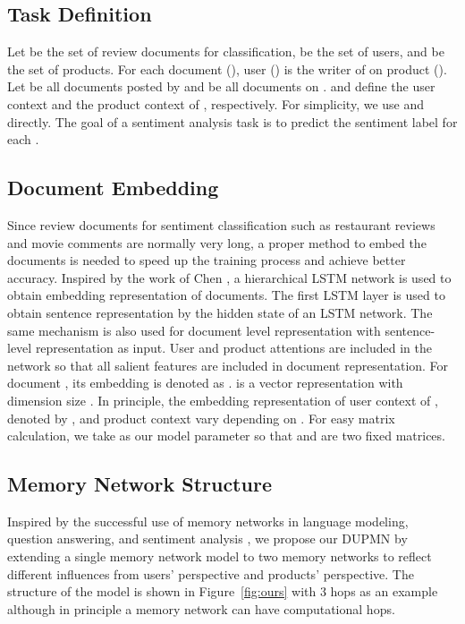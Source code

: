 \documentclass[11pt,a4paper]{article}
\begin{document}
\subsection{Task Definition}
Let  be the set of review documents for classification,  be the set of users, and  be the set of products. For each document (), user () is the writer of  on product (). Let  be all documents posted by  and  be all documents on .  and  define the user context and the product context of , respectively. For simplicity, we use  and  directly. The goal of a sentiment analysis task is to predict the sentiment label for each . 

\subsection{Document Embedding}
    Since review documents for sentiment classification such as restaurant reviews and movie comments are normally very long, a proper method to embed the documents is needed to speed up the training process and achieve better accuracy. Inspired by the work of Chen \cite{chen2016neural}, a hierarchical LSTM network is used to obtain embedding representation of documents. The first LSTM layer is used to obtain sentence representation by the hidden state of an LSTM network. The same mechanism is also used for document level representation with sentence-level representation as input. User and product attentions are included in the network so that all salient features are included in document representation. For document , its embedding is denoted as .  is a vector representation with dimension size . In principle, the embedding representation of user context of , denoted by ,  and product context  vary depending on . For easy matrix calculation, we take  as our model parameter so that  and  are two fixed  matrices.

\subsection{Memory Network Structure}
Inspired by the successful use of memory networks in language modeling, question answering,  and sentiment analysis \cite{sukhbaatar2015end, tang2016aspect,dou2017capturing}, we propose our DUPMN by extending a single memory network model to two memory networks to reflect different influences from users' perspective and products' perspective. The structure of the model is shown in Figure~\ref{fig:ours} with 3 hops as an example although in principle a memory network can have  computational hops. 
\end{document}
